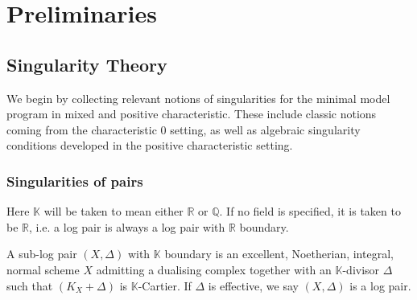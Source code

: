 %
%
%
%
\chapter{Preliminaries}
\section{Singularity Theory} \label{Sings}

We begin by collecting relevant notions of singularities for the minimal model program in mixed and positive characteristic. These include classic notions coming from the characteristic $0$ setting, as well as algebraic singularity conditions developed in the positive characteristic setting.

\subsection{Singularities of pairs}
Here $\mathbb{K}$ will be taken to mean either $\mathbb{R}$ or $\mathbb{Q}$. If no field is specified, it is taken to be $\mathbb{R}$, i.e. a log pair is always a log pair with $\mathbb{R}$ boundary.

\begin{definition}\label{log-pair}
	
	A sub-log pair $(X,\Delta)$  with $\mathbb{K}$ boundary is an excellent, Noetherian, integral, normal scheme $X$ admitting a dualising complex together with an $\mathbb{K}$-divisor $\Delta$ such that $(K_{X}+\Delta)$ is $\mathbb{K}$-Cartier. If $\Delta$ is effective, we say $(X,\Delta)$ is a log pair.
	
	\end{definition}

